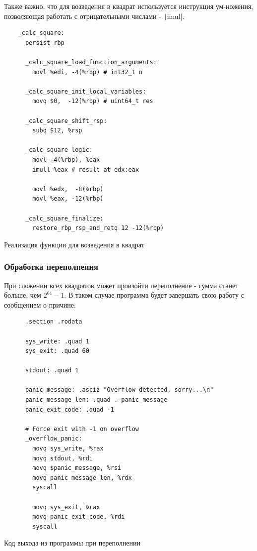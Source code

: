 \documentclass[a4paper]{article}
\begin{document}
  Также важно, что для возведения в квадрат используется инструкция ум-ножения,
  позволяющая работать с отрицательными числами - \texttt|imul|.

  \begin{listing}[H]
    \begin{verbatim}
    _calc_square:
      persist_rbp
    
      _calc_square_load_function_arguments:
        movl %edi, -4(%rbp) # int32_t n
    
      _calc_square_init_local_variables:
        movq $0,  -12(%rbp) # uint64_t res
    
      _calc_square_shift_rsp:
        subq $12, %rsp
    
      _calc_square_logic:
        movl -4(%rbp), %eax
        imull %eax # result at edx:eax
    
        movl %edx,  -8(%rbp)
        movl %eax, -12(%rbp)
    
      _calc_square_finalize:
        restore_rbp_rsp_and_retq 12 -12(%rbp)
    \end{verbatim}
    \caption{Реализация функции для возведения в квадрат}
  \end{listing}

  \subsubsection{Обработка переполнения}

  При сложении всех квадратов может произойти переполнение - сумма станет больше,
  чем $2^{64}-1$. В таком случае программа будет завершать свою работу с сообщением
  о причине:
  \begin{listing}[H]
    \begin{verbatim}
      .section .rodata

      sys_write: .quad 1
      sys_exit: .quad 60
      
      stdout: .quad 1
      
      panic_message: .asciz "Overflow detected, sorry...\n"
      panic_message_len: .quad .-panic_message
      panic_exit_code: .quad -1

      # Force exit with -1 on overflow
      _overflow_panic:
        movq sys_write, %rax
        movq stdout, %rdi
        movq $panic_message, %rsi
        movq panic_message_len, %rdx
        syscall
      
        movq sys_exit, %rax
        movq panic_exit_code, %rdi
        syscall
    \end{verbatim}
    \caption{Код выхода из программы при переполнении}
  \end{listing}
\end{document}
